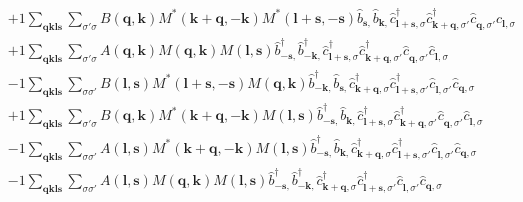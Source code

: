 \begin{align*}
	&+1 \sum_{ \mathbf{q} \mathbf{k} \mathbf{l} \mathbf{s} } \sum_{ \sigma' \sigma } B( \mathbf{q}, \mathbf{k} )  M^*( \mathbf{k}+\mathbf{q}, -\mathbf{k} )  M^*( \mathbf{l}+\mathbf{s}, -\mathbf{s} )   \hat{b}_{ \mathbf{s}, }^{\phantom{\dagger}} \hat{b}_{ \mathbf{k}, }^{\phantom{\dagger}} \hat{c}_{ \mathbf{l}+\mathbf{s}, \sigma }^\dagger  \hat{c}_{ \mathbf{k}+\mathbf{q}, \sigma' }^\dagger  \hat{c}_{ \mathbf{q}, \sigma' }^{\phantom{\dagger}} \hat{c}_{ \mathbf{l}, \sigma }^{\phantom{\dagger}}  \\
	&+1 \sum_{ \mathbf{q} \mathbf{k} \mathbf{l} \mathbf{s} } \sum_{ \sigma' \sigma } A( \mathbf{q}, \mathbf{k} )  M( \mathbf{q}, \mathbf{k} )  M( \mathbf{l}, \mathbf{s} )   \hat{b}_{ -\mathbf{s}, }^\dagger  \hat{b}_{ -\mathbf{k}, }^\dagger  \hat{c}_{ \mathbf{l}+\mathbf{s}, \sigma }^\dagger  \hat{c}_{ \mathbf{k}+\mathbf{q}, \sigma' }^\dagger  \hat{c}_{ \mathbf{q}, \sigma' }^{\phantom{\dagger}} \hat{c}_{ \mathbf{l}, \sigma }^{\phantom{\dagger}}  \\
	&-1 \sum_{ \mathbf{q} \mathbf{k} \mathbf{l} \mathbf{s} } \sum_{ \sigma \sigma' } B( \mathbf{l}, \mathbf{s} )  M^*( \mathbf{l}+\mathbf{s}, -\mathbf{s} )  M( \mathbf{q}, \mathbf{k} )   \hat{b}_{ -\mathbf{k}, }^\dagger  \hat{b}_{ \mathbf{s}, }^{\phantom{\dagger}} \hat{c}_{ \mathbf{k}+\mathbf{q}, \sigma }^\dagger  \hat{c}_{ \mathbf{l}+\mathbf{s}, \sigma' }^\dagger  \hat{c}_{ \mathbf{l}, \sigma' }^{\phantom{\dagger}} \hat{c}_{ \mathbf{q}, \sigma }^{\phantom{\dagger}}  \\
	&+1 \sum_{ \mathbf{q} \mathbf{k} \mathbf{l} \mathbf{s} } \sum_{ \sigma' \sigma } B( \mathbf{q}, \mathbf{k} )  M^*( \mathbf{k}+\mathbf{q}, -\mathbf{k} )  M( \mathbf{l}, \mathbf{s} )   \hat{b}_{ -\mathbf{s}, }^\dagger  \hat{b}_{ \mathbf{k}, }^{\phantom{\dagger}} \hat{c}_{ \mathbf{l}+\mathbf{s}, \sigma }^\dagger  \hat{c}_{ \mathbf{k}+\mathbf{q}, \sigma' }^\dagger  \hat{c}_{ \mathbf{q}, \sigma' }^{\phantom{\dagger}} \hat{c}_{ \mathbf{l}, \sigma }^{\phantom{\dagger}}  \\
	&-1 \sum_{ \mathbf{q} \mathbf{k} \mathbf{l} \mathbf{s} } \sum_{ \sigma \sigma' } A( \mathbf{l}, \mathbf{s} )  M^*( \mathbf{k}+\mathbf{q}, -\mathbf{k} )  M( \mathbf{l}, \mathbf{s} )   \hat{b}_{ -\mathbf{s}, }^\dagger  \hat{b}_{ \mathbf{k}, }^{\phantom{\dagger}} \hat{c}_{ \mathbf{k}+\mathbf{q}, \sigma }^\dagger  \hat{c}_{ \mathbf{l}+\mathbf{s}, \sigma' }^\dagger  \hat{c}_{ \mathbf{l}, \sigma' }^{\phantom{\dagger}} \hat{c}_{ \mathbf{q}, \sigma }^{\phantom{\dagger}}  \\
	&-1 \sum_{ \mathbf{q} \mathbf{k} \mathbf{l} \mathbf{s} } \sum_{ \sigma \sigma' } A( \mathbf{l}, \mathbf{s} )  M( \mathbf{q}, \mathbf{k} )  M( \mathbf{l}, \mathbf{s} )   \hat{b}_{ -\mathbf{s}, }^\dagger  \hat{b}_{ -\mathbf{k}, }^\dagger  \hat{c}_{ \mathbf{k}+\mathbf{q}, \sigma }^\dagger  \hat{c}_{ \mathbf{l}+\mathbf{s}, \sigma' }^\dagger  \hat{c}_{ \mathbf{l}, \sigma' }^{\phantom{\dagger}} \hat{c}_{ \mathbf{q}, \sigma }^{\phantom{\dagger}}  \\

\end{align*}
